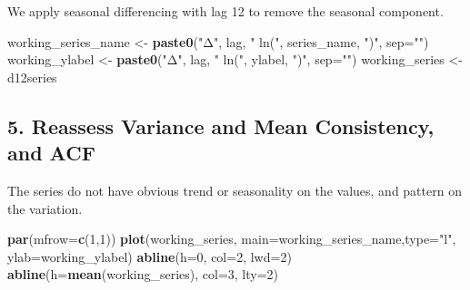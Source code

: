 \documentclass[
]{article}
\newenvironment{Shaded}{\begin{snugshade}}{\end{snugshade}}
\newcommand{\AttributeTok}[1]{\textcolor[rgb]{0.13,0.29,0.53}{#1}}
\newcommand{\ConstantTok}[1]{\textcolor[rgb]{0.56,0.35,0.01}{#1}}
\newcommand{\DecValTok}[1]{\textcolor[rgb]{0.00,0.00,0.81}{#1}}
\newcommand{\FunctionTok}[1]{\textcolor[rgb]{0.13,0.29,0.53}{\textbf{#1}}}
\newcommand{\NormalTok}[1]{#1}
\newcommand{\OtherTok}[1]{\textcolor[rgb]{0.56,0.35,0.01}{#1}}
\newcommand{\SpecialCharTok}[1]{\textcolor[rgb]{0.81,0.36,0.00}{\textbf{#1}}}
\newcommand{\StringTok}[1]{\textcolor[rgb]{0.31,0.60,0.02}{#1}}
\begin{document}
We apply seasonal differencing with lag 12 to remove the seasonal
component.

\begin{Shaded}
\end{Shaded}

\begin{Shaded}
\begin{Highlighting}[]
\NormalTok{working\_series\_name }\OtherTok{\textless{}{-}} \FunctionTok{paste0}\NormalTok{(}\StringTok{"Δ"}\NormalTok{, lag, }\StringTok{" ln("}\NormalTok{, series\_name, }\StringTok{")"}\NormalTok{, }\AttributeTok{sep=}\StringTok{""}\NormalTok{)}
\NormalTok{working\_ylabel }\OtherTok{\textless{}{-}} \FunctionTok{paste0}\NormalTok{(}\StringTok{"Δ"}\NormalTok{, lag, }\StringTok{" ln("}\NormalTok{, ylabel, }\StringTok{")"}\NormalTok{, }\AttributeTok{sep=}\StringTok{""}\NormalTok{)}
\NormalTok{working\_series }\OtherTok{\textless{}{-}}\NormalTok{ d12series}
\end{Highlighting}
\end{Shaded}

\subsection{5. Reassess Variance and Mean Consistency, and
ACF}\label{reassess-variance-and-mean-consistency-and-acf}

The series do not have obvious trend or seasonality on the values, and
pattern on the variation.

\begin{Shaded}
\begin{Highlighting}[]
\FunctionTok{par}\NormalTok{(}\AttributeTok{mfrow=}\FunctionTok{c}\NormalTok{(}\DecValTok{1}\NormalTok{,}\DecValTok{1}\NormalTok{))}
\FunctionTok{plot}\NormalTok{(working\_series, }\AttributeTok{main=}\NormalTok{working\_series\_name,}\AttributeTok{type=}\StringTok{"l"}\NormalTok{, }\AttributeTok{ylab=}\NormalTok{working\_ylabel) }
\FunctionTok{abline}\NormalTok{(}\AttributeTok{h=}\DecValTok{0}\NormalTok{, }\AttributeTok{col=}\DecValTok{2}\NormalTok{, }\AttributeTok{lwd=}\DecValTok{2}\NormalTok{)}
\FunctionTok{abline}\NormalTok{(}\AttributeTok{h=}\FunctionTok{mean}\NormalTok{(working\_series), }\AttributeTok{col=}\DecValTok{3}\NormalTok{, }\AttributeTok{lty=}\DecValTok{2}\NormalTok{)}
\end{Highlighting}
\end{Shaded}
\end{document}
